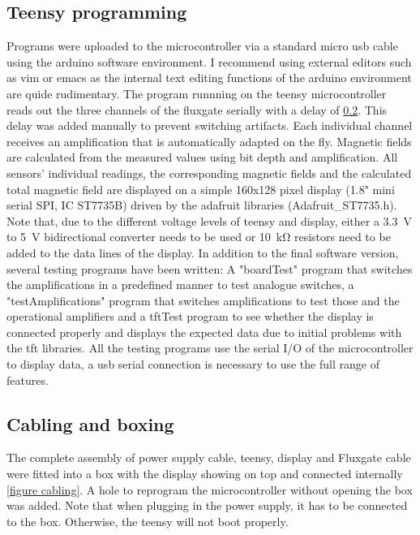         \subsection{Teensy programming}
        Programs were uploaded to the microcontroller via a standard micro usb cable using the arduino software environment. I recommend using external editors such as vim or emacs as the internal text editing functions of the arduino environment are quide rudimentary. The program runnning on the teensy microcontroller reads out the three channels of the fluxgate serially with a delay of \ref{}. This delay was added manually to prevent switching artifacts. Each individual channel receives an amplification that is automatically adapted on the fly. Magnetic fields are calculated from the measured values using bit depth and amplification. All sensors' individual readings, the corresponding magnetic fields and the calculated total magnetic field are displayed on a simple 160x128 pixel display (1.8" mini serial SPI, IC ST7735B) driven by the adafruit libraries (Adafruit\_ST7735.h). Note that, due to the different voltage levels of teensy and display, either a \SI{3.3}{\volt} to \SI{5}{\volt} bidirectional converter needs to be used or \SI{10}{\kilo\ohm} resistors need to be added to the data lines of the display. In addition to the final software version, several testing programs have been written: A "boardTest" program that switches the amplifications in a predefined manner to test analogue switches, a "testAmplifications" program that switches amplifications to test those and the operational amplifiers and a tftTest program to see whether the display is connected properly and displays the expected data due to initial problems with the tft libraries. All the testing programs use the serial I/O of the microcontroller to display data, a usb serial connection is necessary to use the full range of features.
        \subsection{Cabling and boxing}
        The complete assembly of power supply cable, teensy, display and Fluxgate cable were fitted into a box with the display showing on top and connected internally \ref{figure cabling}. A hole to reprogram the microcontroller without opening the box was added. Note that when plugging in the power supply, it has to be connected to the box. Otherwise, the teensy will not boot properly.
%
